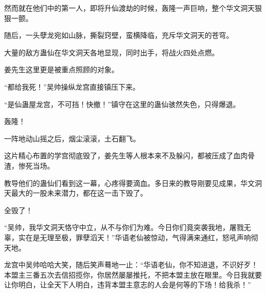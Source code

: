\begin{this_body}
然而就在他们中的第一人，即将升仙渡劫的时候，轰隆一声巨响，整个华文洞天狠狠一颤。

随后，一头孽龙宛如山脉，撕裂窍壁，蛮横降临，充斥华文洞天的苍穹。

大量的敌方蛊仙在华文洞天各地显现，同时出手，将战火四处点燃。

姜先生这里更是被重点照顾的对象。

“都给我死！”吴帅操纵龙宫直接镇压下来。

“是仙蛊屋龙宫，不可挡！快撤！”镇守在这里的蛊仙骇然失色，只得爆退。

轰隆！

一阵地动山摇之后，烟尘滚滚，土石翻飞。

这片精心布置的学宫彻底毁了，姜先生等人根本来不及躲闪，都被压成了血肉骨渣，惨死当场。

教导他们的蛊仙们看到这一幕，心疼得要滴血。多日来的教导刚要见成果，华文洞天最大的一股未来潜力，都在这一击下毁了。

全毁了！

“吴帅，我华文洞天恪守中立，从不与你们为难。今日你们竟突袭我地，屠戮无辜，实在是无理至极，罪孽滔天！”华语老仙被惊动，气得满来通红，怒吼声响彻天地。

龙宫中吴帅哈哈大笑，随后笑声蓦地一止：“华语老仙，你不知进退，不识好歹！本盟主三番五次去信招揽你，你居然屡屡推托，不把本盟主放在眼里。今日我就要让你明白，让全天下人明白，违背本盟主意志的人会是何等的下场！给我杀！”

\end{this_body}

